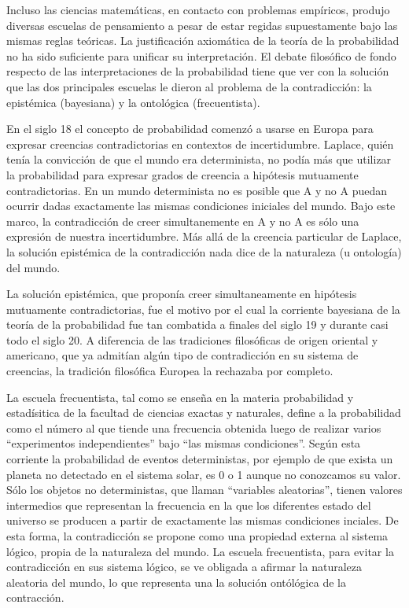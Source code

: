 \documentclass[a4paper,10pt]{book}
\theoremstyle{definition}
\begin{document}
Incluso las ciencias matemáticas, en contacto con problemas empíricos, produjo diversas escuelas de pensamiento a pesar de estar regidas supuestamente bajo las mismas reglas teóricas.
%
La justificación axiomática de la teoría de la probabilidad no ha sido suficiente para unificar su interpretación.
%
El debate filosófico de fondo respecto de las interpretaciones de la probabilidad tiene que ver con la solución que las dos principales escuelas le dieron al problema de la contradicción: la epistémica (bayesiana) y la ontológica (frecuentista).


En el siglo 18 el concepto de probabilidad comenzó a usarse en Europa para expresar creencias contradictorias en contextos de incertidumbre.
%
Laplace, quién tenía la convicción de que el mundo era determinista, no podía más que utilizar la probabilidad para expresar grados de creencia a hipótesis mutuamente contradictorias.
%
En un mundo determinista no es posible que A y no A puedan ocurrir dadas exactamente las mismas condiciones iniciales del mundo.
%
Bajo este marco, la contradicción de creer simultanemente en A y no A es sólo una expresión de nuestra incertidumbre.
%
Más allá de la creencia particular de Laplace, la solución epistémica de la contradicción nada dice de la naturaleza (u ontología) del mundo.


La solución epistémica, que proponía creer simultaneamente en hipótesis mutuamente contradictorias, fue el motivo por el cual la corriente bayesiana de la teoría de la probabilidad fue tan combatida a finales del siglo 19 y durante casi todo el siglo 20.
%
A diferencia de las tradiciones filosóficas de origen oriental y americano, que ya admitían algún tipo de contradicción en su sistema de creencias, la tradición filosófica Europea la rechazaba por completo.


La escuela frecuentista, tal como se enseña en la materia probabilidad y estadísitica de la facultad de ciencias exactas y naturales, define a la probabilidad como el número al que tiende una frecuencia obtenida luego de realizar varios ``experimentos independientes'' bajo ``las mismas condiciones''.
%
Según esta corriente la probabilidad de eventos deterministas, por ejemplo de que exista un planeta no detectado en el sistema solar, es 0 o 1 aunque no conozcamos su valor.
%
Sólo los objetos no deterministas, que llaman ``variables aleatorias'', tienen valores intermedios que representan la frecuencia en la que los diferentes estado del universo se producen a partir de exactamente las mismas condiciones inciales.
%
De esta forma, la contradicción se propone como una propiedad externa al sistema lógico, propia de la naturaleza del mundo.
%
La escuela frecuentista, para evitar la contradicción en sus sistema lógico, se ve obligada a afirmar la naturaleza aleatoria del mundo, lo que representa una la solución ontólógica de la contracción.
\end{document}

